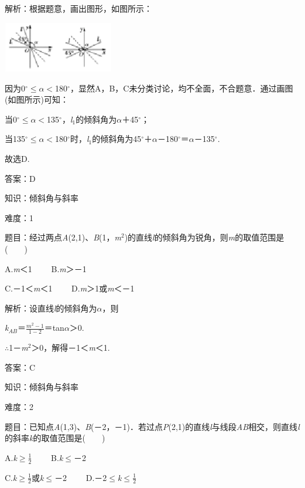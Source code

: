 \documentclass{article} %
\begin{document}
解析：根据题意，画出图形，如图所示：

\includegraphics*[width=1.91in, height=0.87in, keepaspectratio=false]{image266}

因为0$\mathrm{{}^\circ}$$\mathrm{\le}$\textit{$\alpha$}$\mathrm{<}$180$\mathrm{{}^\circ}$，显然A，B，C未分类讨论，均不全面，不合题意．通过画图(如图所示)可知：

当0$\mathrm{{}^\circ}$$\mathrm{\le}$\textit{$\alpha$}$\mathrm{<}$135$\mathrm{{}^\circ}$，\textit{l}${}_{1}$的倾斜角为\textit{$\alpha$}＋45$\mathrm{{}^\circ}$；

当135$\mathrm{{}^\circ}$$\mathrm{\le}$\textit{$\alpha$}$\mathrm{<}$180$\mathrm{{}^\circ}$时，\textit{l}${}_{1}$的倾斜角为45$\mathrm{{}^\circ}$＋\textit{$\alpha$}－180$\mathrm{{}^\circ}$＝\textit{$\alpha$}－135$\mathrm{{}^\circ}$.

故选D.

答案：D

知识：倾斜角与斜率

难度：1

题目：经过两点\textit{A}(2,1)、\textit{B}(1，\textit{m}${}^{2}$)的直线\textit{l}的倾斜角为锐角，则\textit{m}的取值范围是(　　)

A.\textit{m}＜1　　  B.\textit{m}＞－1

C.－1＜\textit{m}＜1　　  D.\textit{m}＞1或\textit{m}＜－1

解析：设直线\textit{l}的倾斜角为\textit{$\alpha$}，则

\textit{k${}_{AB}$}＝$\frac{m^2-1}{1-2}$＝tan\textit{$\alpha$}＞0.

$\mathrm{\therefore}$1－\textit{m}${}^{2}$＞0，解得－1＜\textit{m}＜1.

答案：C

知识：倾斜角与斜率

难度：2

题目：已知点\textit{A}(1,3)、\textit{B}(－2，－1)．若过点\textit{P}(2,1)的直线\textit{l}与线段\textit{AB}相交，则直线\textit{l}的斜率\textit{k}的取值范围是(　　)

A.\textit{k}$\mathrm{\ge}\frac{1}{2}$　　  B.\textit{k}$\mathrm{\le}$－2

C.\textit{k}$\mathrm{\ge}\frac{1}{2}$或\textit{k}$\mathrm{\le}$－2　　  D.－2$\mathrm{\le}$\textit{k}$\mathrm{\le}\frac{1}{2}$
\end{document}

